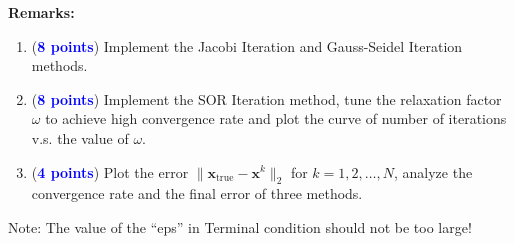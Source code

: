 \documentclass[english,onecolumn]{IEEEtran}
\begin{document}
\textbf{Remarks:}
\begin{enumerate}
    \item (\textcolor{blue}{\textbf{8 points}}) Implement the Jacobi Iteration and Gauss-Seidel Iteration methods.
    \item (\textcolor{blue}{\textbf{8 points}}) Implement the SOR Iteration method, tune the relaxation factor $\omega$ to achieve high convergence rate and plot the curve of number of iterations v.s. the value of $\omega$.
    \item (\textcolor{blue}{\textbf{4 points}}) Plot the error $\|\mathbf{x}_{\mathrm{true}} - \mathbf{x}^k\|_2$ for $k=1,2,\dots,N$, analyze the convergence rate and the final error of three methods.
\end{enumerate}
Note: The value of the ``eps'' in Terminal condition should not be too large!
\end{document}

